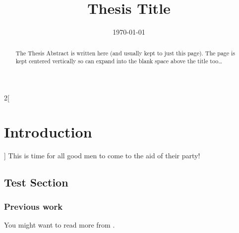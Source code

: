 \documentclass[a4paper, 11pt, oneside]{article/HSR}  %
\begin{document}
  \title  {Thesis Title}
  \addresses {\groupname\\\deptname\\\univname}  %
  \date      {\today}
  \subject   {}
  \keywords  {}

  \maketitle


  \begin{abstract}
    The Thesis Abstract is written here (and usually kept to just this page). The page is kept centered vertically so can expand into the blank space above the title too\ldots
  \end{abstract}

  \clearpage

  \tableofcontentspage









  \begin{multicols}{2}[\section{Introduction}]
    \label{introduction}
    This is time for all good men to come to the aid of their party!

    \subsection{Test Section}\label{test section}
    \Blindtext
    \Blindtext
    \Blindtext

    \subsubsection{Previous work}\label{previous work}
    You might want to read more from \citet{einstein}.
    \vfill\null
    \clearpage
  \end{multicols}
\end{document}
